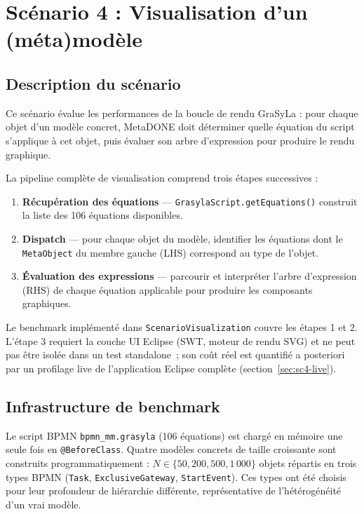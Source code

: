 \newpage
\section{Scénario 4 : Visualisation d'un (méta)modèle}
\label{sec:scenario4}

\subsection{Description du scénario}

Ce scénario évalue les performances de la boucle de rendu GraSyLa : pour
chaque objet d'un modèle concret, MetaDONE doit déterminer quelle équation
du script s'applique à cet objet, puis évaluer son arbre d'expression pour
produire le rendu graphique.

La pipeline complète de visualisation comprend trois étapes successives :

\begin{enumerate}
  \item \textbf{Récupération des équations} —
        \texttt{GrasylaScript.getEquations()} construit la liste des 106
        équations disponibles.
  \item \textbf{Dispatch} — pour chaque objet du modèle, identifier les
        équations dont le \texttt{MetaObject} du membre gauche (LHS)
        correspond au type de l'objet.
  \item \textbf{Évaluation des expressions} — parcourir et interpréter
        l'arbre d'expression (RHS) de chaque équation applicable pour
        produire les composants graphiques.
\end{enumerate}

Le benchmark implémenté dans \texttt{ScenarioVisualization} couvre les
étapes 1 et 2. L'étape 3 requiert la couche UI Eclipse (SWT, moteur
de rendu SVG) et ne peut pas être isolée dans un test standalone~;
son coût réel est quantifié a posteriori par un profilage live de
l'application Eclipse complète (section~\ref{sec:sc4-live}).

\subsection{Infrastructure de benchmark}

Le script BPMN \texttt{bpmn\_mm.grasyla} (106 équations) est chargé en
mémoire une seule fois en \texttt{@BeforeClass}. Quatre modèles concrets de
taille croissante sont construits programmatiquement :
$N \in \{50, 200, 500, 1\,000\}$ objets répartis en trois types BPMN
(\texttt{Task}, \texttt{ExclusiveGateway}, \texttt{StartEvent}). Ces types
ont été choisis pour leur profondeur de hiérarchie différente, représentative
de l'hétérogénéité d'un vrai modèle.

